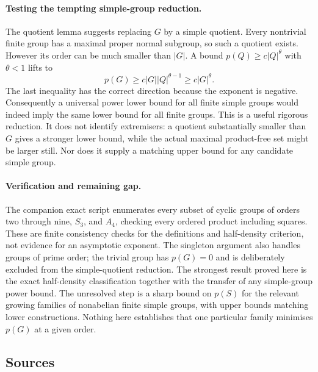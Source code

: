\documentclass[11pt,a4paper]{article}
\begin{document}
\paragraph{Testing the tempting simple-group reduction.}
The quotient lemma suggests replacing $G$ by a simple quotient. Every nontrivial finite group has a maximal proper normal subgroup, so such a quotient exists. However its order can be much smaller than $|G|$. A bound $p(Q)\geq c|Q|^\theta$ with $\theta<1$ lifts to
\[
 p(G)\geq c|G||Q|^{\theta-1}\geq c|G|^\theta.
\]
The last inequality has the correct direction because the exponent is negative. Consequently a universal power lower bound for all finite simple groups would indeed imply the same lower bound for all finite groups. This is a useful rigorous reduction. It does not identify extremisers: a quotient substantially smaller than $G$ gives a stronger lower bound, while the actual maximal product-free set might be larger still. Nor does it supply a matching upper bound for any candidate simple group.

\paragraph{Verification and remaining gap.}
The companion exact script enumerates every subset of cyclic groups of orders two through nine, $S_3$, and $A_4$, checking every ordered product including squares. These are finite consistency checks for the definitions and half-density criterion, not evidence for an asymptotic exponent. The singleton argument also handles groups of prime order; the trivial group has $p(G)=0$ and is deliberately excluded from the simple-quotient reduction. The strongest result proved here is the exact half-density classification together with the transfer of any simple-group power bound. The unresolved step is a sharp bound on $p(S)$ for the relevant growing families of nonabelian finite simple groups, with upper bounds matching lower constructions. Nothing here establishes that one particular family minimises $p(G)$ at a given order.

\subsection{Sources}
\end{document}
